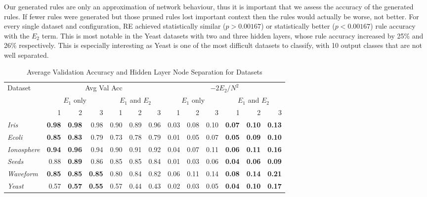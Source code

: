 Our generated rules are only an approximation of network behaviour,
thus it is important that we assess the accuracy of the generated rules.
If fewer rules were generated but those pruned rules
lost important context then the rules would actually be worse, not better.
For every single dataset and configuration, RE achieved
statistically similar ($p > 0.00167$) or statistically better ($p < 0.00167$)
rule accuracy with the $E_2$ term. This is most
notable in the Yeast datasets with two and three hidden layers, whose rule
accuracy increased by 25\% and 26\% respectively. This is especially interesting
as Yeast is one of the most difficult datasets to classify, with 10 output
classes that are not well separated. 

\begin{table}[t!]
  \centering
  \small
  \begin{tabular}{|l|r|r|r|r|r|r|r|r|r|r|r|r|}
    \hline
    Dataset & 
    \multicolumn{6}{c|}{Avg Val Acc} & 
    \multicolumn{6}{c|}{$-2E_2/N^2$} \\
    \cline{2-13}
    & \multicolumn{3}{c|}{$E_1$ only} &
    \multicolumn{3}{c|}{$E_1$ and $E_2$} &
    \multicolumn{3}{c|}{$E_1$ only} &
    \multicolumn{3}{c|}{$E_1$ and $E_2$} \\
    \cline{2-13}
    & 1 & 2 & 3 & 1 & 2 & 3 & 1 & 2 & 3 & 1 & 2 & 3 \\
    \hline
    \textit{Iris} & \textbf{0.98} & \textbf{0.98} & 0.98 & 0.90 & 0.89 & 0.96 & 0.03 &0.08 & 0.10 & \textbf{0.07} & \textbf{0.10} & \textbf{0.13} \\
    \textit{Ecoli} & \textbf{0.85} & \textbf{0.83} & 0.79 & 0.73 & 0.78 & 0.79 & 0.01 & 0.05 & 0.07 & \textbf{0.05} & \textbf{0.09} & \textbf{0.10} \\
    \textit{Ionosphere} & \textbf{0.94} & \textbf{0.96} & 0.94 & 0.90 & 0.91 & 0.92 & 0.04 & 0.07 & 0.11 & \textbf{0.06} & \textbf{0.11} & \textbf{0.16} \\
    \textit{Seeds} & 0.88 & \textbf{0.89} & 0.86 & 0.85 & 0.85 & 0.84 & 0.01 & 0.03 & 0.06 & \textbf{0.04} & \textbf{0.06} & \textbf{0.09} \\
    \textit{Waveform} & \textbf{0.85} & \textbf{0.85} & \textbf{0.85} & 0.80 & 0.84 & 0.82 & 0.06 & 0.11 & 0.14 & \textbf{0.08} & \textbf{0.14} & \textbf{0.21} \\
    \textit{Yeast} & 0.57 & \textbf{0.57} & \textbf{0.55} & 0.57 & 0.44 & 0.43 & 0.02 & 0.03 & 0.05 & \textbf{0.04} & \textbf{0.10} & \textbf{0.17} \\
    \hline
  \end{tabular}
  \caption{Average Validation Accuracy and Hidden Layer Node Separation for Datasets}
  \label{tab:e1_e2_avgs}  
\end{table}


